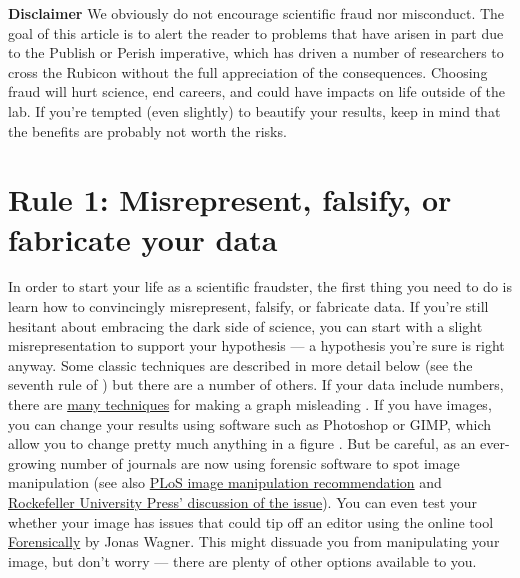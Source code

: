 \documentclass[11pt,letter]{article}
\providecommand\citep{\cite}
\begin{document}
\textbf{Disclaimer} We obviously do not encourage scientific fraud nor misconduct. The goal of this article is to alert the reader to problems that have arisen in part due to the Publish or Perish imperative, which has driven a number of researchers to cross the Rubicon without the full appreciation of the consequences. Choosing fraud will hurt science, end careers, and could have impacts on life outside of the lab. If you're tempted (even  slightly) to beautify your results, keep in mind that the benefits are probably not worth the risks.

\section*{Rule 1: Misrepresent, falsify, or fabricate your data}

In order to start your life as a scientific fraudster, the
first thing you need to do is learn how to convincingly
misrepresent, falsify, or fabricate data. If you're still hesitant about
embracing the dark side of science, you can start with a slight
misrepresentation to support your hypothesis --- a hypothesis you're sure is right anyway. Some classic techniques are
described in more detail below (see the seventh rule of \citep{rougier:2014}) but there are a number of others. If your data include numbers, there are \href{https://en.wikipedia.org/wiki/Misleading_graph}{many
  techniques} for making a graph misleading \citep{wainer:1984,raschke:2008}. If you have images, you
can change your results using
software such as Photoshop or GIMP, which allow you to change pretty
much anything in a figure \citep{cromey:2012, hendricks:2011}. But be careful, as an ever-growing number of
journals are now using forensic software to spot image manipulation
\citep{white:2007, rossner:2004,hsu:2015} (see also
\href{http://journals.plos.org/ploscompbiol/s/figures#loc-image-manipulation}{PLoS
  image manipulation recommendation} and \href{http://jcb.rupress.org/content/166/1/11}{Rockefeller University Press' discussion of the issue}). You can even test your whether your image has issues that could tip off an editor using the online tool \href{https://29a.ch/photo-forensics/#forensic-magnifier}{Forensically}
by Jonas Wagner. This might dissuade you from manipulating your image, but don't worry --- there are plenty of other options available to you.\\
\end{document}
